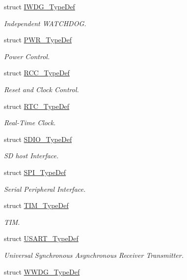\begin{DoxyCompactItemize}
struct \hyperlink{struct_i_w_d_g___type_def}{I\-W\-D\-G\-\_\-\-Type\-Def}
\begin{DoxyCompactList}\small\item\em Independent W\-A\-T\-C\-H\-D\-O\-G. \end{DoxyCompactList}\item 
struct \hyperlink{struct_p_w_r___type_def}{P\-W\-R\-\_\-\-Type\-Def}
\begin{DoxyCompactList}\small\item\em Power Control. \end{DoxyCompactList}\item 
struct \hyperlink{struct_r_c_c___type_def}{R\-C\-C\-\_\-\-Type\-Def}
\begin{DoxyCompactList}\small\item\em Reset and Clock Control. \end{DoxyCompactList}\item 
struct \hyperlink{struct_r_t_c___type_def}{R\-T\-C\-\_\-\-Type\-Def}
\begin{DoxyCompactList}\small\item\em Real-\/\-Time Clock. \end{DoxyCompactList}\item 
struct \hyperlink{struct_s_d_i_o___type_def}{S\-D\-I\-O\-\_\-\-Type\-Def}
\begin{DoxyCompactList}\small\item\em S\-D host Interface. \end{DoxyCompactList}\item 
struct \hyperlink{struct_s_p_i___type_def}{S\-P\-I\-\_\-\-Type\-Def}
\begin{DoxyCompactList}\small\item\em Serial Peripheral Interface. \end{DoxyCompactList}\item 
struct \hyperlink{struct_t_i_m___type_def}{T\-I\-M\-\_\-\-Type\-Def}
\begin{DoxyCompactList}\small\item\em T\-I\-M. \end{DoxyCompactList}\item 
struct \hyperlink{struct_u_s_a_r_t___type_def}{U\-S\-A\-R\-T\-\_\-\-Type\-Def}
\begin{DoxyCompactList}\small\item\em Universal Synchronous Asynchronous Receiver Transmitter. \end{DoxyCompactList}\item 
struct \hyperlink{struct_w_w_d_g___type_def}{W\-W\-D\-G\-\_\-\-Type\-Def}

\end{DoxyCompactItemize}
